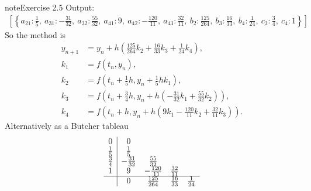 \documentclass[letterpaper,10pt,english]{jupyterBook}
\begin{document}
\begin{sphinxadmonition}{note}{Exercise 2.5}
\sphinxAtStartPar
Output:
\begin{equation}\label{equation:intro:ex2.5-glue}
\begin{split}\displaystyle \left[ \left\{ a_{21} : \frac{1}{5}, \  a_{31} : - \frac{31}{32}, \  a_{32} : \frac{55}{32}, \  a_{41} : 9, \  a_{42} : - \frac{120}{11}, \  a_{43} : \frac{32}{11}, \  b_{2} : \frac{125}{264}, \  b_{3} : \frac{16}{33}, \  b_{4} : \frac{1}{24}, \  c_{3} : \frac{3}{4}, \  c_{4} : 1\right\}\right]\end{split}
\end{equation}
\sphinxAtStartPar
So the method is
\begin{align*}
    y_{n+1} &= y_n + h(\tfrac{125}{264} k_2 + \tfrac{16}{33} k_3 + \tfrac{1}{24} k_4), \\
    k_1 &= f(t_n, y_n), \\
    k_2 &= f(t_n + \tfrac{1}{5}h, y_n + \tfrac{1}{5}h k_1), \\
    k_3 &= f(t_n + \tfrac{3}{4}h, y_n + h(-\tfrac{31}{32} k_1 + \tfrac{55}{32} k_2)), \\
    k_4 &= f(t_n + h, y_n + h(9 k_1 - \tfrac{120}{11} k_2 + \tfrac{32}{11} k_3)).
\end{align*}
\sphinxAtStartPar
Alternatively as a Butcher tableau
\begin{align*}
    \begin{array}{c|cccc}
    0 & 0 \\
    \frac{1}{5} & \frac{1}{5} \\
    \frac{3}{4} & -\frac{31}{32} & \frac{55}{32} \\
    1 & 9 & -\frac{120}{11} & \frac{32}{11} \\
    \hline
    & 0 & \frac{125}{264} & \frac{16}{33} & \frac{1}{24}
    \end{array}
\end{align*}\end{sphinxadmonition}
\end{document}
